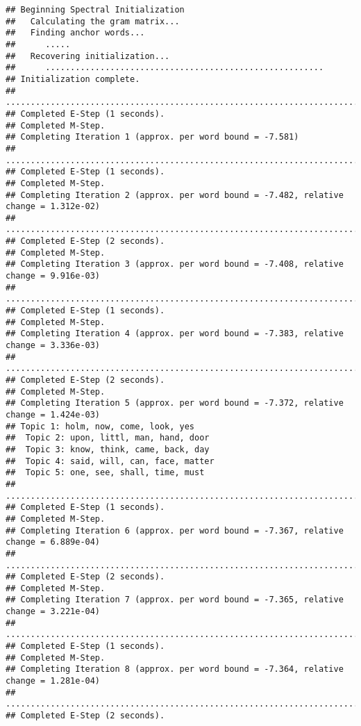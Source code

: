 \documentclass[
]{book}
\begin{document}
\begin{verbatim}
## Beginning Spectral Initialization 
##   Calculating the gram matrix...
##   Finding anchor words...
##      .....
##   Recovering initialization...
##      ........................................................
## Initialization complete.
## ....................................................................................................
## Completed E-Step (1 seconds). 
## Completed M-Step. 
## Completing Iteration 1 (approx. per word bound = -7.581) 
## ....................................................................................................
## Completed E-Step (1 seconds). 
## Completed M-Step. 
## Completing Iteration 2 (approx. per word bound = -7.482, relative change = 1.312e-02) 
## ....................................................................................................
## Completed E-Step (2 seconds). 
## Completed M-Step. 
## Completing Iteration 3 (approx. per word bound = -7.408, relative change = 9.916e-03) 
## ....................................................................................................
## Completed E-Step (1 seconds). 
## Completed M-Step. 
## Completing Iteration 4 (approx. per word bound = -7.383, relative change = 3.336e-03) 
## ....................................................................................................
## Completed E-Step (2 seconds). 
## Completed M-Step. 
## Completing Iteration 5 (approx. per word bound = -7.372, relative change = 1.424e-03) 
## Topic 1: holm, now, come, look, yes 
##  Topic 2: upon, littl, man, hand, door 
##  Topic 3: know, think, came, back, day 
##  Topic 4: said, will, can, face, matter 
##  Topic 5: one, see, shall, time, must 
## ....................................................................................................
## Completed E-Step (1 seconds). 
## Completed M-Step. 
## Completing Iteration 6 (approx. per word bound = -7.367, relative change = 6.889e-04) 
## ....................................................................................................
## Completed E-Step (2 seconds). 
## Completed M-Step. 
## Completing Iteration 7 (approx. per word bound = -7.365, relative change = 3.221e-04) 
## ....................................................................................................
## Completed E-Step (1 seconds). 
## Completed M-Step. 
## Completing Iteration 8 (approx. per word bound = -7.364, relative change = 1.281e-04) 
## ....................................................................................................
## Completed E-Step (2 seconds). 

\end{verbatim}
\end{document}
